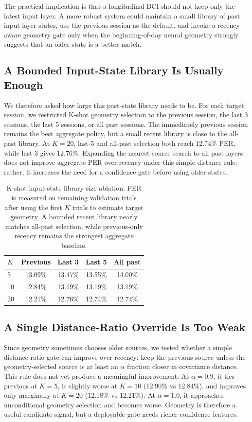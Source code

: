 \documentclass{article}
\begin{document}
The practical implication is that a longitudinal BCI should not keep only the latest input layer. A more robust system could maintain a small library of past input-layer states, use the previous session as the default, and invoke a recency-aware geometry gate only when the beginning-of-day neural geometry strongly suggests that an older state is a better match.

\subsection{A Bounded Input-State Library Is Usually Enough}
We therefore asked how large this past-state library needs to be. For each target session, we restricted K-shot geometry selection to the previous session, the last 3 sessions, the last 5 sessions, or all past sessions. The immediately previous session remains the best aggregate policy, but a small recent library is close to the all-past library. At $K=20$, last-5 and all-past selection both reach 12.74\% PER, while last-3 gives 12.76\%. Expanding the nearest-source search to all past layers does not improve aggregate PER over recency under this simple distance rule; rather, it increases the need for a confidence gate before using older states.

\begin{table}[t]
\centering
\caption{K-shot input-state library-size ablation. PER is measured on remaining validation trials after using the first $K$ trials to estimate target geometry. A bounded recent library nearly matches all-past selection, while previous-only recency remains the strongest aggregate baseline.}
\small
\begin{tabular}{lcccc}
\toprule
$K$ & Previous & Last 3 & Last 5 & All past \\
\midrule
5 & 13.09\% & 13.47\% & 13.55\% & 14.00\% \\
10 & 12.84\% & 13.19\% & 13.19\% & 13.19\% \\
20 & 12.21\% & 12.76\% & 12.74\% & 12.74\% \\
\bottomrule
\end{tabular}
\label{tab:library-size}
\end{table}

\subsection{A Single Distance-Ratio Override Is Too Weak}
Since geometry sometimes chooses older sources, we tested whether a simple distance-ratio gate can improve over recency: keep the previous source unless the geometry-selected source is at least an $\alpha$ fraction closer in covariance distance. This rule does not yet produce a meaningful improvement. At $\alpha=0.9$, it ties previous at $K=5$, is slightly worse at $K=10$ (12.90\% vs 12.84\%), and improves only marginally at $K=20$ (12.18\% vs 12.21\%). At $\alpha=1.0$, it approaches unconditional geometry selection and becomes worse. Geometry is therefore a useful candidate signal, but a deployable gate needs richer confidence features.
\end{document}
